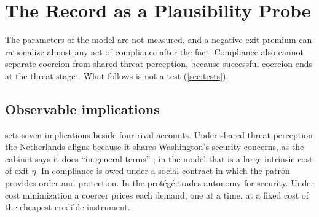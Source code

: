 \section{The Record as a Plausibility Probe}\label{sec:evidence}

The parameters of the model are not measured, and a negative exit premium can rationalize almost any act of compliance after the fact. Compliance also cannot separate coercion from shared threat perception, because successful coercion ends at the threat stage \citep{drezner2003hidden}. What follows is not a test (\cref{sec:tests}).

\subsection{Observable implications}\label{sec:predictions}

 sets seven implications beside four rival accounts. Under shared threat perception the Netherlands aligns because it shares Washington's security concerns, as the cabinet says it does ``in general terms'' \citep[our translation]{tk2026match}; in the model that is a large intrinsic cost of exit $\eta$. In \citet{lake2009hierarchy} compliance is owed under a social contract in which the patron provides order and protection. In \citet{morrow1991alliances} the protégé trades autonomy for security. Under cost minimization a coercer prices each demand, one at a time, at a fixed cost of the cheapest credible instrument.

